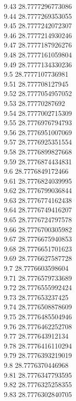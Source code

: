 {9.43	28.7777296773086\\
9.44	28.7777269353055\\
9.45	28.7777242072307\\
9.46	28.7777214930246\\
9.47	28.7777187926276\\
9.48	28.7777161059804\\
9.49	28.7777134330236\\
9.5	28.7777107736981\\
9.51	28.777708127945\\
9.52	28.7777054957052\\
9.53	28.77770287692\\
9.54	28.7777002715309\\
9.55	28.7776976794793\\
9.56	28.7776951007069\\
9.57	28.7776925351554\\
9.58	28.7776899827668\\
9.59	28.7776874434831\\
9.6	28.7776849172466\\
9.61	28.7776824039995\\
9.62	28.7776799036844\\
9.63	28.7776774162438\\
9.64	28.7776749416207\\
9.65	28.7776724797578\\
9.66	28.7776700305982\\
9.67	28.7776675940853\\
9.68	28.7776651701623\\
9.69	28.7776627587728\\
9.7	28.7776603598604\\
9.71	28.7776579733689\\
9.72	28.7776555992424\\
9.73	28.777653237425\\
9.74	28.7776508878609\\
9.75	28.7776485504946\\
9.76	28.7776462252708\\
9.77	28.777643912134\\
9.78	28.7776416110294\\
9.79	28.7776393219019\\
9.8	28.7776370446968\\
9.81	28.7776347793595\\
9.82	28.7776325258355\\
9.83	28.7776302840705\\
}

